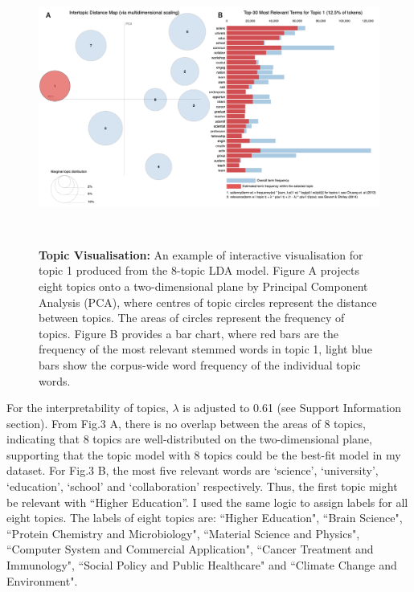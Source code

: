 \begin{figure}[H]
    \centering
    \includegraphics[width = 16cm, height = 9cm]{./img/LDAvis.pdf}
    \caption[Interactive visualisation for topic distributions]{\textbf{Topic Visualisation:} An example of interactive visualisation for topic 1 produced from the 8-topic LDA model. Figure A projects eight topics onto a two-dimensional plane by Principal Component Analysis (PCA), where centres of topic circles represent the distance between topics. The areas of circles represent the frequency of topics. Figure B provides a bar chart, where red bars are the frequency of the most relevant stemmed words in topic 1, light blue bars show the corpus-wide word frequency of the individual topic words.}
\end{figure}

For the interpretability of topics, $\lambda$ is adjusted to 0.61 (see Support Information section). From Fig.3 A, there is no overlap between the areas of 8 topics, indicating that 8 topics are well-distributed on the two-dimensional plane, supporting that the topic model with 8 topics could be the best-ﬁt model in my dataset. For Fig.3 B, the most ﬁve relevant words are `science’, `university’, `education’, `school’ and `collaboration’ respectively. Thus, the ﬁrst topic might be relevant with ``Higher Education”. I used the same logic to assign labels for all eight topics. The labels of eight topics are: ``Higher Education", ``Brain Science", ``Protein Chemistry and Microbiology", ``Material Science and Physics", ``Computer System and Commercial Application", ``Cancer Treatment and Immunology", ``Social Policy and Public Healthcare" and ``Climate Change and Environment".

